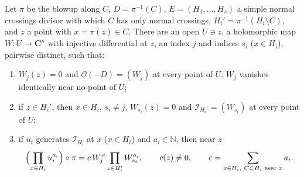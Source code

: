 \begin{lemma}
\label{bcalc:monomial-chart}
\mixedleanok
Let \(\pi\) be the blowup along \(C\), \(D=\pi^{-1}(C)\), \(E=(H_1,\dots,H_s)\) a simple normal crossings divisor with which \(C\) has only
normal crossings, \(H_i'=\overline{\pi^{-1}(H_i\setminus C)}\), and \(z\) a point with \(x=\pi(z)\in C\). There are an open \(U\ni z\), a holomorphic
map \(W\colon U\to\mathbf C^n\) with injective differential at \(z\), an index \(j\) and indices \(s_i\) (\(x\in H_i\)), pairwise distinct, such that:
\begin{enumerate}
\item \(W_j(z)=0\) and \(\mathcal O(-D)=(W_j)\) at every point of \(U\); \(W_j\) vanishes identically near no point of \(U\);
\item if \(z\in H_i'\), then \(x\in H_i\), \(s_i\ne j\), \(W_{s_i}(z)=0\) and \(\mathcal I_{H_i'}=(W_{s_i})\) at every point of \(U\);
\item if \(u_i\) generates \(\mathcal I_{H_i}\) at \(x\) (\(x\in H_i\)) and \(a_i\in\mathbb N\), then near \(z\)
\[
 \Bigl(\prod_{x\in H_i}u_i^{a_i}\Bigr)\circ\pi=c\,W_j^{\,e}\prod_{z\in H_i'}W_{s_i}^{a_i},\qquad c(z)\ne0,\qquad
 e=\sum_{x\in H_i,\ C\subset H_i\text{ near }x}a_i .
\]
\end{enumerate}
\end{lemma}
